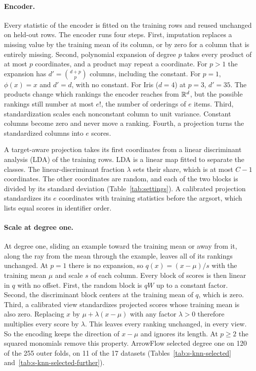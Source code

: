 \paragraph{Encoder.} Every statistic of the encoder is fitted on the training rows and reused unchanged on held-out rows. The encoder runs four steps. First, imputation replaces a missing value by the training mean of its column, or by zero for a column that is entirely missing. Second, polynomial expansion of degree $p$ takes every product of at most $p$ coordinates, and a product may repeat a coordinate. For $p>1$ the expansion has $d'=\binom{d+p}{p}$ columns, including the constant. For $p=1$, $\phi(x)=x$ and $d'=d$, with no constant. For Iris ($d=4$) at $p=3$, $d'=35$. The products change which rankings the encoder reaches from $\mathbb{R}^d$, but the possible rankings still number at most $e!$, the number of orderings of $e$ items. Third, standardization scales each nonconstant column to unit variance. Constant columns become zero and never move a ranking. Fourth, a projection turns the standardized columns into $e$ scores.

A target-aware projection takes its first coordinates from a linear discriminant analysis (LDA) of the training rows. LDA is a linear map fitted to separate the classes. The linear-discriminant fraction $\lambda$ sets their share, which is at most $C-1$ coordinates. The other coordinates are random, and each of the two blocks is divided by its standard deviation (Table~\ref{tab:settings}). A calibrated projection standardizes its $e$ coordinates with training statistics before the argsort, which lists equal scores in identifier order.

\paragraph{Scale at degree one.} At degree one, sliding an example toward the training mean or away from it, along the ray from the mean through the example, leaves all of its rankings unchanged. At $p=1$ there is no expansion, so $q(x)=(x-\mu)/s$ with the training mean $\mu$ and scale $s$ of each column. Every block of scores is then linear in $q$ with no offset. First, the random block is $qW$ up to a constant factor. Second, the discriminant block centers at the training mean of $q$, which is zero. Third, a calibrated view standardizes projected scores whose training mean is also zero. Replacing $x$ by $\mu+\lambda(x-\mu)$ with any factor $\lambda>0$ therefore multiplies every score by $\lambda$. This leaves every ranking unchanged, in every view. So the encoding keeps the direction of $x-\mu$ and ignores its length. At $p\ge2$ the squared monomials remove this property. ArrowFlow selected degree one on 120 of the 255 outer folds, on 11 of the 17 datasets (Tables~\ref{tab:s-knn-selected} and~\ref{tab:s-knn-selected-further}).

